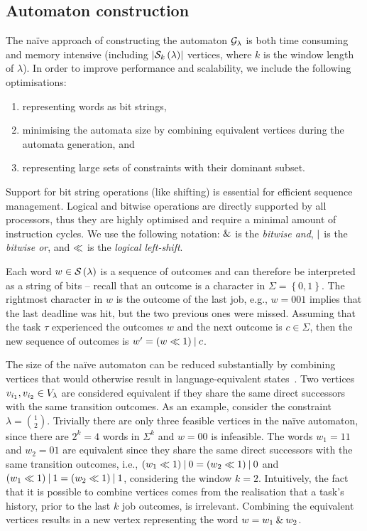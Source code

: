 \subsection{Automaton construction}%
\label{sec:tool:scalable}%
%
The na{\"i}ve approach of constructing the automaton $\mathcal{G}_{\lambda}$ is both time consuming and memory intensive (including $\left|\mathcal{S}_{k}\left( \lambda \right)\right|$ vertices, where $k$ is the window length of $\lambda$).
In order to improve performance and scalability, we include the following optimisations: 
%
\begin{enumerate}[label=(\roman*)]
    \item representing words as bit strings,
    \item minimising the automata size by combining equivalent vertices during the automata generation, and
    \item representing large sets of constraints with their dominant subset.
\end{enumerate}
%
Support for bit string operations (like shifting) is essential for efficient sequence management.
Logical and bitwise operations are directly supported by all processors, thus they are highly optimised and require a minimal amount of instruction cycles.
We use the following notation: $\mathbin{\&}$ is the \emph{bitwise and}, $\mathbin{|}$ is the \emph{bitwise or}, and $\ll$ is the \emph{logical left-shift}. 

Each word $w \in \mathcal{S}_{}\left( \lambda \right)$ is a sequence of outcomes and can therefore be interpreted as a string of bits -- recall that an outcome is a character in $\Sigma = \left\{ 0,1 \right\}$.
The rightmost character in $w$ is the outcome of the last job, e.g., $w=001$ implies that the last deadline was hit, but the two previous ones were missed.
Assuming that the task $\tau$ experienced the outcomes $w$ and the next outcome is $c \in \Sigma$, then the new sequence of outcomes is $w' = \left( w \ll 1 \right) \mathbin{|} c$.

The size of the na{\"i}ve automaton can be reduced substantially by combining vertices that would otherwise result in language-equivalent states~\cite{Hopcroft:2006}.
Two vertices $v_{i_1}, v_{i_2} \in V_{\lambda}$ are considered equivalent if they share the same direct successors with the same transition outcomes.
%
As an example, consider the \tAH{} constraint $\lambda = \binom{1}{2}$. 
Trivially there are only three feasible vertices in the na{\"i}ve automaton, since there are $2^k = 4$ words in $\Sigma^k$ and $w = 00$ is infeasible.
The words $w_1 = 11$ and $w_2 = 01$ are equivalent since they share the same direct successors with the same transition outcomes, i.e., $\left( w_1 \ll 1 \right) \mathbin{|} 0 = \left( w_2 \ll 1 \right) \mathbin{|} 0$ and $\left( w_1 \ll 1 \right) \mathbin{|} 1 = \left( w_2 \ll 1 \right) \mathbin{|} 1$, considering the window $k = 2$.
Intuitively, the fact that it is possible to combine vertices comes from the realisation that a task's history, prior to the last $k$ job outcomes, is irrelevant. 
Combining the equivalent vertices results in a new vertex representing the word $w = w_1 \mathbin{\&} w_2$.

